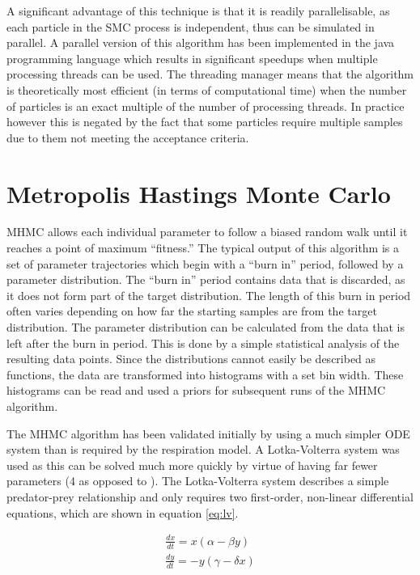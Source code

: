 A significant advantage of this technique is that it is readily parallelisable, as each particle in the SMC process is independent, thus can be simulated in parallel. A parallel version of this algorithm has been implemented in the java programming language which results in significant speedups when multiple processing threads can be used. The threading manager means that the algorithm is theoretically most efficient (in terms of computational time) when the number of particles is an exact multiple of the number of processing threads. In practice however this is negated by the fact that some particles require multiple samples due to them not meeting the acceptance criteria.


\section{Metropolis Hastings Monte Carlo}

MHMC allows each individual parameter to follow a biased random walk until it reaches a point of maximum ``fitness.'' The typical output of this algorithm is a set of parameter trajectories which begin with a ``burn in'' period, followed by a parameter distribution. The ``burn in'' period contains data that is discarded, as it does not form part of the target distribution. The length of this burn in period often varies depending on how far the starting samples are from the target distribution. The parameter distribution can be calculated from the data that is left after the burn in period. This is done by a simple statistical analysis of the resulting data points. Since the distributions cannot easily be described as functions, the data are transformed into histograms with a set bin width. These histograms can be read and used a priors for subsequent runs of the MHMC algorithm.

The MHMC algorithm has been validated initially by using a much simpler ODE system than is required by the respiration model. A Lotka-Volterra system was used as this can be solved much more quickly by virtue of having far fewer parameters (4 as opposed to ). The Lotka-Volterra system describes a simple predator-prey relationship and only requires two first-order, non-linear differential equations, which are shown in equation \ref{eq:lv}.

\begin{eqnarray}
\frac{dx}{dt} = x (\alpha - \beta y)\nonumber \\
\frac{dy}{dt} = -y (\gamma - \delta x)
\label{eq:lv}
\end{eqnarray}

